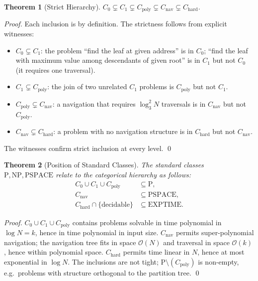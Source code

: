 \documentclass[twocolumn,a4paper]{article}
\newtheorem{theorem}{Theorem}[section]
\begin{document}
\begin{theorem}[Strict Hierarchy]
\label{thm:strict-hierarchy}
$C_{0}\subsetneq C_{1}\subsetneq C_{\text{poly}}\subsetneq C_{\text{nav}}\subsetneq C_{\text{hard}}$.
\end{theorem}

\begin{proof}
Each inclusion is by definition. The strictness follows from explicit witnesses:
\begin{itemize}[nosep,leftmargin=*]
\item $C_{0}\subsetneq C_{1}$: the problem ``find the leaf at given address'' is in $C_{0}$; ``find the leaf with maximum value among descendants of given root'' is in $C_{1}$ but not $C_{0}$ (it requires one traversal).
\item $C_{1}\subsetneq C_{\text{poly}}$: the join of two unrelated $C_{1}$ problems is $C_{\text{poly}}$ but not $C_{1}$.
\item $C_{\text{poly}}\subsetneq C_{\text{nav}}$: a navigation that requires $\log_{3}^{2}N$ traversals is in $C_{\text{nav}}$ but not $C_{\text{poly}}$.
\item $C_{\text{nav}}\subsetneq C_{\text{hard}}$: a problem with no navigation structure is in $C_{\text{hard}}$ but not $C_{\text{nav}}$.
\end{itemize}
The witnesses confirm strict inclusion at every level. \qed
\end{proof}

\begin{theorem}[Position of Standard Classes]
\label{thm:standard-classes}
The standard classes $\mathrm{P},\mathrm{NP},\mathrm{PSPACE}$ relate to the categorical hierarchy as follows:
\begin{align*}
C_{0}\cup C_{1}\cup C_{\text{poly}} &\subseteq \mathrm{P},\\
C_{\text{nav}} &\subseteq \mathrm{PSPACE},\\
C_{\text{hard}}\cap\{\text{decidable}\} &\subseteq \mathrm{EXPTIME}.
\end{align*}
\end{theorem}

\begin{proof}
$C_{0}\cup C_{1}\cup C_{\text{poly}}$ contains problems solvable in time polynomial in $\log N=k$, hence in time polynomial in input size. $C_{\text{nav}}$ permits super-polynomial navigation; the navigation tree fits in space $\mathcal{O}(N)$ and traversal in space $\mathcal{O}(k)$, hence within polynomial space. $C_{\text{hard}}$ permits time linear in $N$, hence at most exponential in $\log N$. The inclusions are not tight; $\mathrm{P}\setminus(C_{\text{poly}})$ is non-empty, e.g.\ problems with structure orthogonal to the partition tree. \qed
\end{proof}
\end{document}
